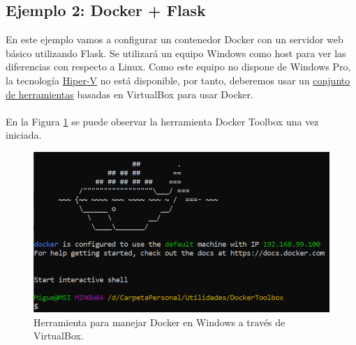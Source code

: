 \documentclass[11pt,a4paper]{article}
\begin{document}
\subsection{Ejemplo 2: Docker + Flask}
En este ejemplo vamos a configurar un contenedor Docker con un servidor web básico utilizando Flask. Se utilizará un equipo Windows como host para ver las diferencias con respecto a Linux. Como este equipo no dispone de Windows Pro, la tecnología \href{https://docs.microsoft.com/es-es/virtualization/hyper-v-on-windows/about/}{Hiper-V} no está disponible, por tanto, deberemos usar un \href{https://docs.docker.com/toolbox/toolbox_install_windows/}{conjunto de herramientas} basadas en VirtualBox para usar Docker.\\\\
En la Figura \ref{fig:E3_1} se puede observar la herramienta Docker Toolbox una vez iniciada.

\begin{figure}[H]
	\centering
	\includegraphics[scale=0.4]{images/E3_1.png}
	\caption[Docker Toolbox para Windows]{Herramienta para manejar Docker en Windows a través de VirtualBox.}
	\label{fig:E3_1}
\end{figure}
\end{document}
